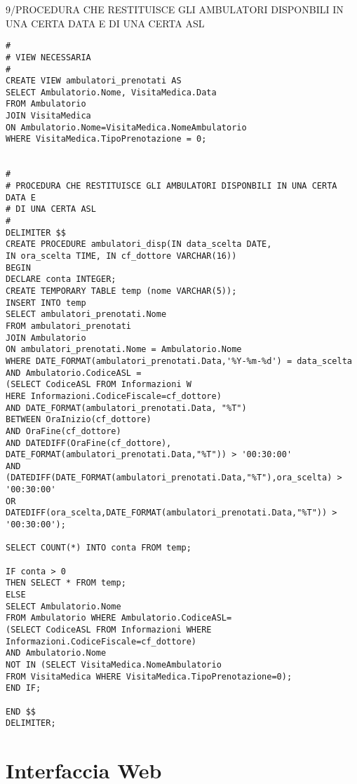 \documentclass{report}
\begin{document}
9/PROCEDURA CHE RESTITUISCE GLI AMBULATORI DISPONBILI IN UNA CERTA DATA E DI UNA CERTA ASL
\begin{verbatim}
#
# VIEW NECESSARIA
# 
CREATE VIEW ambulatori_prenotati AS 
SELECT Ambulatorio.Nome, VisitaMedica.Data 
FROM Ambulatorio 
JOIN VisitaMedica 
ON Ambulatorio.Nome=VisitaMedica.NomeAmbulatorio 
WHERE VisitaMedica.TipoPrenotazione = 0;


#
# PROCEDURA CHE RESTITUISCE GLI AMBULATORI DISPONBILI IN UNA CERTA DATA E 
# DI UNA CERTA ASL
# 
DELIMITER $$
CREATE PROCEDURE ambulatori_disp(IN data_scelta DATE, 
IN ora_scelta TIME, IN cf_dottore VARCHAR(16))
BEGIN
DECLARE conta INTEGER;
CREATE TEMPORARY TABLE temp (nome VARCHAR(5));
INSERT INTO temp
SELECT ambulatori_prenotati.Nome
FROM ambulatori_prenotati 
JOIN Ambulatorio 
ON ambulatori_prenotati.Nome = Ambulatorio.Nome  
WHERE DATE_FORMAT(ambulatori_prenotati.Data,'%Y-%m-%d') = data_scelta
AND Ambulatorio.CodiceASL = 
(SELECT CodiceASL FROM Informazioni W
HERE Informazioni.CodiceFiscale=cf_dottore)
AND DATE_FORMAT(ambulatori_prenotati.Data, "%T") 
BETWEEN OraInizio(cf_dottore)
AND OraFine(cf_dottore)
AND DATEDIFF(OraFine(cf_dottore),
DATE_FORMAT(ambulatori_prenotati.Data,"%T")) > '00:30:00'
AND 
(DATEDIFF(DATE_FORMAT(ambulatori_prenotati.Data,"%T"),ora_scelta) > '00:30:00'
OR 
DATEDIFF(ora_scelta,DATE_FORMAT(ambulatori_prenotati.Data,"%T")) > '00:30:00');

SELECT COUNT(*) INTO conta FROM temp;

IF conta > 0 
THEN SELECT * FROM temp;
ELSE 
SELECT Ambulatorio.Nome 
FROM Ambulatorio WHERE Ambulatorio.CodiceASL=
(SELECT CodiceASL FROM Informazioni WHERE Informazioni.CodiceFiscale=cf_dottore) 
AND Ambulatorio.Nome 
NOT IN (SELECT VisitaMedica.NomeAmbulatorio 
FROM VisitaMedica WHERE VisitaMedica.TipoPrenotazione=0);
END IF;

END $$
DELIMITER;

\end{verbatim}



\section*{Interfaccia Web}
\end{document}
